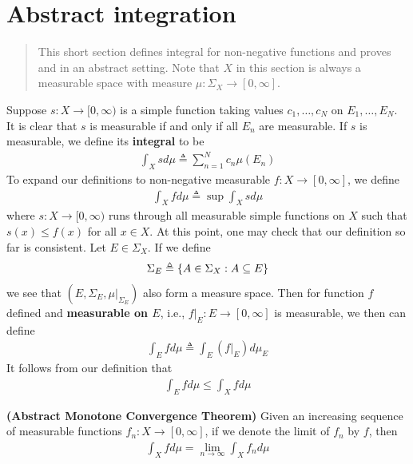 \documentclass{report}
\begin{document}
\section{Abstract integration} 
\label{Ai}
\begin{abstract}
This short section defines integral for non-negative functions and proves  and  in an abstract setting.  Note that $X$ in this section is always a measurable space with measure $\mu:\Sigma_X\rightarrow [0,\infty]$. 
\end{abstract}
\begin{mdframed}
Suppose $s:X\rightarrow [0,\infty)$ is a simple function taking values $c_1,\dots ,c_N$ on $E_1,\dots ,E_N$. It is clear that $s$ is measurable if and only if all $E_n$ are measurable. If $s$ is measurable, we define its \textbf{integral} to be 
\begin{align*}
\int_X s d\mu \triangleq \sum_{n=1}^N c_n \mu (E_n)
\end{align*}
To expand our definitions to non-negative measurable $f:X\rightarrow [0,\infty]$, we define  
\begin{align*}
  \int_X fd\mu \triangleq \sup \int_X sd\mu
\end{align*}
where $s:X\rightarrow [0,\infty)$ runs through all measurable simple functions on $X$ such that $s(x)\leq f(x)$ for all $x\in X$. At this point, one may check that our definition so far is consistent.  
Let $E\in \Sigma_X$. If we define 
\begin{align*}
\Sigma_E\triangleq \{ A\in \Sigma_X: A \subseteq E \}
\end{align*}
we see that $(E,\Sigma_E, \mu |_{\Sigma_E})$ also form a measure space. Then for function $f$ defined and \textbf{measurable on $E$}, i.e., $f|_E:E\rightarrow [0,\infty]$ is measurable, we then can define  
\begin{align*}
\int_E fd\mu\triangleq \int_E (f|_E)d\mu_E
\end{align*}
It follows from our definition that 
 \begin{align*}
\int_E fd\mu \leq \int_X fd\mu
\end{align*}
\end{mdframed}
\begin{theorem}
\label{MCTn}
\textbf{(Abstract Monotone Convergence Theorem)} Given an increasing sequence of measurable functions $f_n:X\rightarrow [0,\infty]$, if we denote the limit of $f_n$ by $f$, then 
\begin{align*}
  \int_X fd\mu = \lim_{n\to \infty}\int_X f_n d\mu
\end{align*}
\end{theorem}
\end{document}
